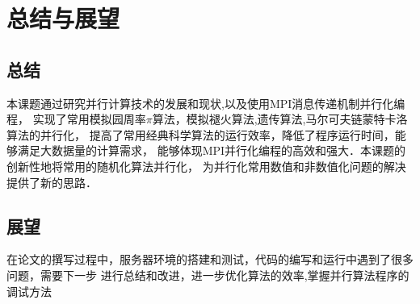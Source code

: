 
\chapter{总结与展望}


\section{总结}
本课题通过研究并行计算技术的发展和现状,以及使用MPI消息传递机制并行化编程，
实现了常用模拟园周率$\pi$算法，模拟褪火算法,遗传算法,马尔可夫链蒙特卡洛算法的并行化，
提高了常用经典科学算法的运行效率，降低了程序运行时间，能够满足大数据量的计算需求，
能够体现MPI并行化编程的高效和强大．本课题的创新性地将常用的随机化算法并行化，
为并行化常用数值和非数值化问题的解决提供了新的思路．


\section{展望}
在论文的撰写过程中，服务器环境的搭建和测试，代码的编写和运行中遇到了很多问题，需要下一步
进行总结和改进，进一步优化算法的效率,掌握并行算法程序的调试方法



